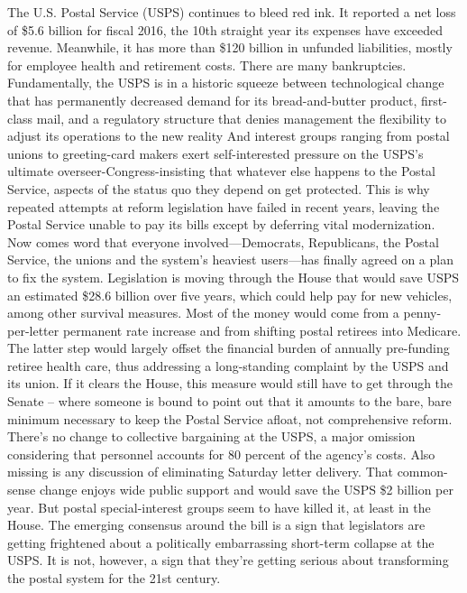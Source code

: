 The U.S. Postal Service (USPS) continues to bleed red ink. It reported a net loss of \$5.6 billion for fiscal 2016, the 10th straight year its expenses have exceeded revenue. Meanwhile, it has more than \$120 billion in unfunded liabilities, mostly for employee health and retirement costs. There are many bankruptcies. Fundamentally, the USPS is in a historic squeeze between technological change that has permanently decreased demand for its bread-and-butter product, first-class mail, and a regulatory structure that denies management the flexibility to adjust its operations to the new reality
And interest groups ranging from postal unions to greeting-card makers exert self-interested pressure on the USPS’s ultimate overseer-Congress-insisting that whatever else happens to the Postal Service, aspects of the status quo they depend on get protected. This is why repeated attempts at reform legislation have failed in recent years, leaving the Postal Service unable to pay its bills except by deferring vital modernization.
Now comes word that everyone involved---Democrats, Republicans, the Postal Service, the unions and the system's heaviest users—has finally agreed on a plan to fix the system. Legislation is moving through the House that would save USPS an estimated \$28.6 billion over five years, which could help pay for new vehicles, among other survival measures. Most of the money would come from a penny-per-letter permanent rate increase and from shifting postal retirees into Medicare. The latter step would largely offset the financial burden of annually pre-funding retiree health care, thus addressing a long-standing complaint by the USPS and its union.
If it clears the House, this measure would still have to get through the Senate – where someone is bound to point out that it amounts to the bare, bare minimum necessary to keep the Postal Service afloat, not comprehensive reform. There’s no change to collective bargaining at the USPS, a major omission considering that personnel accounts for 80 percent of the agency’s costs. Also missing is any discussion of eliminating Saturday letter delivery. That common-sense change enjoys wide public support and would save the USPS \$2 billion per year. But postal special-interest groups seem to have killed it, at least in the House. The emerging consensus around the bill is a sign that legislators are getting frightened about a politically embarrassing short-term collapse at the USPS. It is not, however, a sign that they’re getting serious about transforming the postal system for the 21st century.

